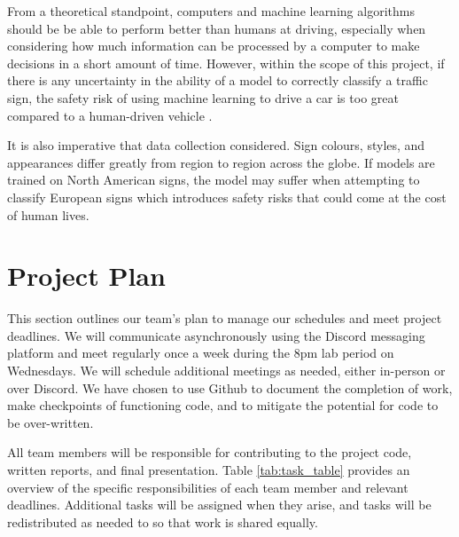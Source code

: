 \documentclass{article} %
\begin{document}
From a theoretical standpoint, computers and machine learning algorithms should be be able to perform better than humans at driving, especially when considering how much information can be processed by a computer to make decisions in a short amount of time. However, within the scope of this project, if there is any uncertainty in the ability of a model to correctly classify a traffic sign, the safety risk of using machine learning to drive a car is too great compared to a human-driven vehicle \citep{9498342}. 

It is also imperative that data collection considered. Sign colours, styles, and appearances differ greatly from region to region across the globe. If models are trained on North American signs, the model may suffer when attempting to classify European signs which introduces safety risks that could come at the cost of human lives.

\section{Project Plan}
\label{ProjectPlan}
This section outlines our team's plan to manage our schedules and meet project deadlines. We will communicate asynchronously using the Discord messaging platform and meet regularly once a week during the 8pm lab period on Wednesdays. We will schedule additional meetings as needed, either in-person or over Discord. We have chosen to use Github to document the completion of work, make checkpoints of functioning code, and to mitigate the potential for code to be over-written.

All team members will be responsible for contributing to the project code, written reports, and final presentation. Table \ref{tab:task_table} provides an overview of the specific responsibilities of each team member and relevant deadlines. Additional tasks will be assigned when they arise, and tasks will be redistributed as needed to so that work is shared equally.
\end{document}
